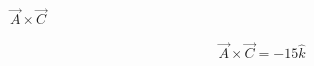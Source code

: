 $\overrightarrow{A} \times \overrightarrow{C}$

\begin{solution}
\begin{align*}
    \overrightarrow{A} \times \overrightarrow{C} = -15 \hat{k}
\end{align*}
\end{solution}